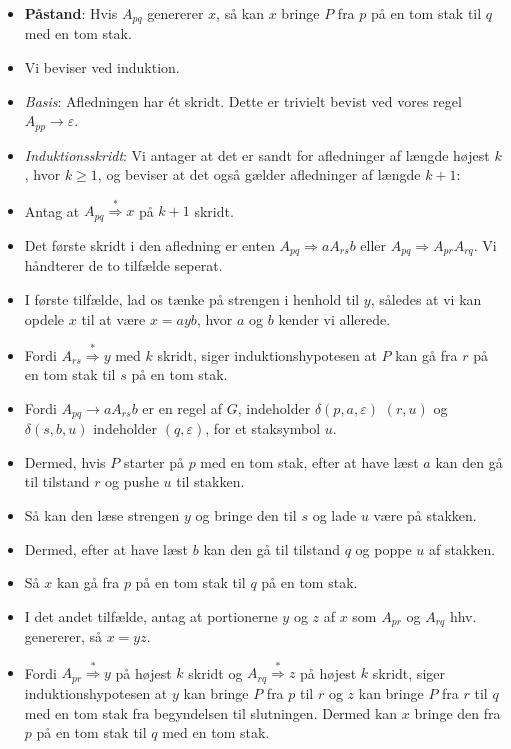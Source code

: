 \begin{frame}[allowframebreaks]
\begin{itemize}
		\item \textbf{Påstand}:
		      Hvis $A_{pq}$ genererer $x$, så kan $x$ bringe $P$ fra $p$ på en tom stak til $q$ med en tom stak.
		\item Vi beviser ved induktion.
		\item \textit{Basis}: Afledningen har ét skridt. Dette er trivielt bevist ved vores regel $A_{pp} \rightarrow \varepsilon$.
		\item \textit{Induktionsskridt}: Vi antager at det er sandt for afledninger af længde højest $k$, hvor $k \ge 1$, og beviser at det også gælder afledninger af længde $k+1$:
		\item Antag at $A_{pq} \overset{*}{\Rightarrow} x$ på $k+1$ skridt.
		\item Det første skridt i den afledning er enten $A_{pq} \Rightarrow aA_{rs}b$ eller $A_{pq} \Rightarrow A_{pr}A_{rq}$. Vi håndterer de to tilfælde seperat.
		\item I første tilfælde, lad os tænke på strengen i henhold til $y$, således at vi kan opdele $x$ til at være $x = ayb$, hvor $a$ og $b$ kender vi allerede.
		\item Fordi $A_{rs} \overset{*}{\Rightarrow} y$ med $k$ skridt, siger induktionshypotesen at $P$ kan gå fra $r$ på en tom stak til $s$ på en tom stak.
		\item Fordi $A_{pq} \rightarrow aA_{rs}b$ er en regel af $G$, indeholder $\delta(p,a,\varepsilon)$ $(r,u)$ og $\delta(s,b,u)$ indeholder $(q, \varepsilon)$, for et staksymbol $u$.
		\item Dermed, hvis $P$ starter på $p$ med en tom stak, efter at have læst $a$ kan den gå til tilstand $r$ og pushe $u$ til stakken.
		\item Så kan den læse strengen $y$ og bringe den til $s$ og lade $u$ være på stakken.
		\item Dermed, efter at have læst $b$ kan den gå til tilstand $q$ og poppe $u$ af stakken.
		\item Så $x$ kan gå fra $p$ på en tom stak til $q$ på en tom stak.
		\item I det andet tilfælde, antag at portionerne $y$ og $z$ af $x$  som $A_{pr}$ og $A_{rq}$ hhv. genererer, så $x = yz$.
		\item Fordi $A_{pr} \overset{*}{\Rightarrow} y$ på højest $k$ skridt og $A_{rq} \overset{*}{\Rightarrow} z$ på højest $k$ skridt, siger induktionshypotesen at $y$ kan bringe $P$ fra $p$ til $r$ og $z$ kan bringe $P$ fra $r$ til $q$ med en tom stak fra begyndelsen til slutningen. Dermed kan $x$ bringe den fra $p$ på en tom stak til $q$ med en tom stak.

\end{itemize}
\end{frame}
